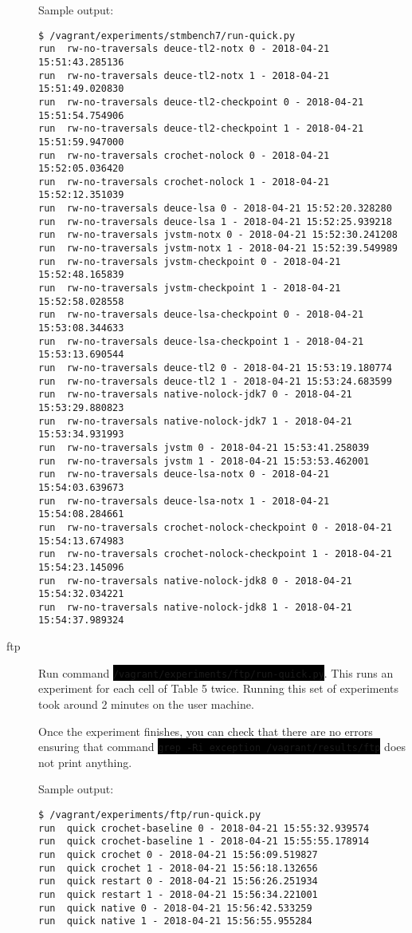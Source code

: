 \documentclass[12pt]{article}
\newcommand{\command}[1]{\colorbox{black}{\texttt{\color{white}#1}}}
\begin{document}
\begin{description}
Sample output:
\begin{verbatim}
$ /vagrant/experiments/stmbench7/run-quick.py
run  rw-no-traversals deuce-tl2-notx 0 - 2018-04-21 15:51:43.285136
run  rw-no-traversals deuce-tl2-notx 1 - 2018-04-21 15:51:49.020830
run  rw-no-traversals deuce-tl2-checkpoint 0 - 2018-04-21 15:51:54.754906
run  rw-no-traversals deuce-tl2-checkpoint 1 - 2018-04-21 15:51:59.947000
run  rw-no-traversals crochet-nolock 0 - 2018-04-21 15:52:05.036420
run  rw-no-traversals crochet-nolock 1 - 2018-04-21 15:52:12.351039
run  rw-no-traversals deuce-lsa 0 - 2018-04-21 15:52:20.328280
run  rw-no-traversals deuce-lsa 1 - 2018-04-21 15:52:25.939218
run  rw-no-traversals jvstm-notx 0 - 2018-04-21 15:52:30.241208
run  rw-no-traversals jvstm-notx 1 - 2018-04-21 15:52:39.549989
run  rw-no-traversals jvstm-checkpoint 0 - 2018-04-21 15:52:48.165839
run  rw-no-traversals jvstm-checkpoint 1 - 2018-04-21 15:52:58.028558
run  rw-no-traversals deuce-lsa-checkpoint 0 - 2018-04-21 15:53:08.344633
run  rw-no-traversals deuce-lsa-checkpoint 1 - 2018-04-21 15:53:13.690544
run  rw-no-traversals deuce-tl2 0 - 2018-04-21 15:53:19.180774
run  rw-no-traversals deuce-tl2 1 - 2018-04-21 15:53:24.683599
run  rw-no-traversals native-nolock-jdk7 0 - 2018-04-21 15:53:29.880823
run  rw-no-traversals native-nolock-jdk7 1 - 2018-04-21 15:53:34.931993
run  rw-no-traversals jvstm 0 - 2018-04-21 15:53:41.258039
run  rw-no-traversals jvstm 1 - 2018-04-21 15:53:53.462001
run  rw-no-traversals deuce-lsa-notx 0 - 2018-04-21 15:54:03.639673
run  rw-no-traversals deuce-lsa-notx 1 - 2018-04-21 15:54:08.284661
run  rw-no-traversals crochet-nolock-checkpoint 0 - 2018-04-21 15:54:13.674983
run  rw-no-traversals crochet-nolock-checkpoint 1 - 2018-04-21 15:54:23.145096
run  rw-no-traversals native-nolock-jdk8 0 - 2018-04-21 15:54:32.034221
run  rw-no-traversals native-nolock-jdk8 1 - 2018-04-21 15:54:37.989324
\end{verbatim}

    \item[ftp] Run command
        \command{/vagrant/experiments/ftp/run-quick.py}.  This runs an
        experiment for each cell of Table 5 twice.  Running this set of
        experiments took around 2 minutes on the user machine.

        Once the experiment finishes, you can check that there are no errors
        ensuring that command \command{grep -Ri exception /vagrant/results/ftp}
        does not print anything.
        
        Sample output:
        \begin{verbatim}
$ /vagrant/experiments/ftp/run-quick.py
run  quick crochet-baseline 0 - 2018-04-21 15:55:32.939574
run  quick crochet-baseline 1 - 2018-04-21 15:55:55.178914
run  quick crochet 0 - 2018-04-21 15:56:09.519827
run  quick crochet 1 - 2018-04-21 15:56:18.132656
run  quick restart 0 - 2018-04-21 15:56:26.251934
run  quick restart 1 - 2018-04-21 15:56:34.221001
run  quick native 0 - 2018-04-21 15:56:42.533259
run  quick native 1 - 2018-04-21 15:56:55.955284
        \end{verbatim}


\end{description}
\end{document}

